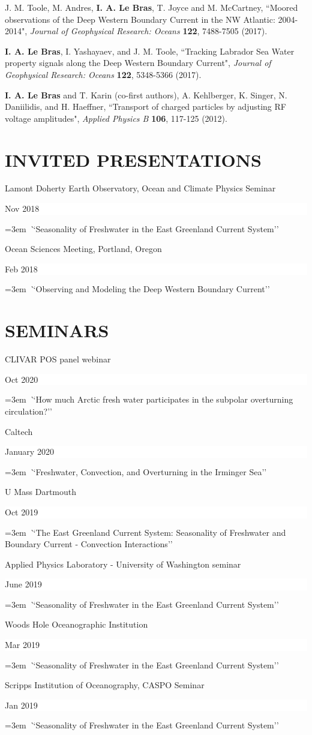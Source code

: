 \documentclass[paper=letter,fontsize=11pt]{scrartcl} %
\newcommand{\sepspace}{\vspace*{3mm}}		%
\newcommand{\NewPart}[2]{\section*{\uppercase{#1} #2}}
\newcommand{\PaperEntry}[6]{
		\noindent #1, ``#2", \textit{#3} \textbf{#4}, #5 (#6).}
\newcommand{\TalkEntry}[3]{
		\noindent #1 \hfill      %
		\colorbox{White}{%
			\parbox{6em}{%
			\hfill\color{Black}#2}} \par  %
		\noindent\hangindent=3em\hangafter=0 \textit ``#3''\sepspace} %
\begin{document}
\begin{etaremune}
\item \PaperEntry{J. M. Toole, M. Andres, \textbf{I. A. Le Bras}, T. Joyce and M. McCartney}{Moored observations of the Deep Western Boundary Current in the NW Atlantic: 2004-2014}{ Journal of Geophysical Research: Oceans}{122}{7488-7505}{2017}

\item \PaperEntry{\textbf{I. A. Le Bras}, I. Yashayaev, and J. M. Toole}{Tracking Labrador Sea Water property signals along the Deep Western Boundary Current}{ Journal of Geophysical Research: Oceans}{122}{5348-5366}{2017}

\item \PaperEntry{\textbf{I. A. Le Bras} and T. Karin (co-first authors), A. Kehlberger, K. Singer, N. Daniilidis, and H. Haeffner}{Transport of charged particles by adjusting RF voltage amplitudes}{Applied Physics B}{106}{117-125}{2012}

\end{etaremune}


\NewPart{Invited presentations}{}

\TalkEntry{Lamont Doherty Earth Observatory, Ocean and Climate Physics Seminar}{Nov 2018}{Seasonality of Freshwater in the East Greenland Current System}

\TalkEntry{Ocean Sciences Meeting, Portland, Oregon}{Feb 2018}{Observing and Modeling the Deep Western Boundary Current}

\NewPart{Seminars}{}

\TalkEntry{CLIVAR POS panel webinar}{Oct 2020}{How much Arctic fresh water participates in the subpolar overturning circulation?}

\TalkEntry{Caltech}{January 2020}{Freshwater, Convection, and Overturning in the Irminger Sea}

\TalkEntry{U Mass Dartmouth}{Oct 2019}{The East Greenland Current System: Seasonality of Freshwater and Boundary Current - Convection Interactions}

\TalkEntry{Applied Physics Laboratory - University of Washington seminar}{June 2019}{Seasonality of Freshwater in the East Greenland Current System}

\TalkEntry{Woods Hole Oceanographic Institution}{Mar 2019}{Seasonality of Freshwater in the East Greenland Current System}

\TalkEntry{Scripps Institution of Oceanography, CASPO Seminar}{Jan 2019}{Seasonality of Freshwater in the East Greenland Current System}
\end{document}
